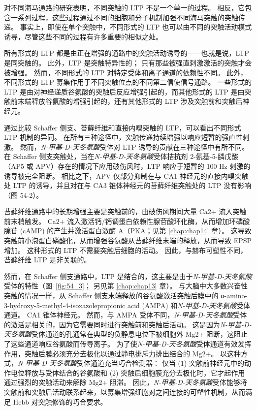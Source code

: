 对不同海马通路的研究表明，不同突触的 LTP 不是一个单一的过程。
相反，它包含一系列过程，这些过程通过不同的细胞和分子机制加强不同海马突触的突触传递。
事实上，即使在单个突触中，不同形式的 LTP 也可以由不同的突触活动模式诱导，尽管这些不同的过程有许多重要的相似之处。


所有形式的 LTP 都是由正在增强的通路中的突触活动诱导的——也就是说，LTP 是同突触的。
此外，LTP 是突触特异性的；
只有那些被强直刺激激活的突触才会被增强。
然而，不同形式的 LTP 对特定受体和离子通道的依赖性不同。 此外，不同形式的 LTP 募集作用于不同突触位点的不同第二信使信号通路。
一些形式的 LTP 是由对神经递质谷氨酸的突触后反应增强引起的，而其他形式的 LTP 是由突触前末端释放谷氨酸的增强引起的，还有其他形式的 LTP 涉及突触前和突触后神经元。


通过比较 Schaffer 侧支、苔藓纤维和直接内嗅突触的 LTP，可以看出不同形式 LTP 机制的异同。
在所有三种途径中，突触传递持续增强以响应短暂的强直性刺激。
然而，\textit{N-甲基-D-天冬氨酸}受体对 LTP 诱导的贡献在三种途径中有所不同。
在 Schaffer 侧支突触处，当在\textit{N-甲基-D-天冬氨酸}受体拮抗剂 2-氨基-5-膦戊酸（AP5 或 APV）存在的情况下应用破伤风时，LTP 响应于短暂的 100 Hz 刺激的诱导被完全阻断。
相比之下，APV 仅部分抑制在与 CA1 神经元的直接内嗅突触处 LTP 的诱导，并且对在与 CA3 锥体神经元的苔藓纤维突触处的 LTP 没有影响（图 54-2）。


苔藓纤维通路中的长期增强主要是突触前的，由破伤风期间大量 Ca2+ 流入突触前末梢触发。
Ca2+ 流入激活钙/钙调蛋白依赖性腺苷酸环化酶，从而增加环磷酸腺苷 (cAMP) 的产生并激活蛋白激酶 A（PKA；见第 \ref{chap:chap14} 章）。
这导致突触前小泡蛋白磷酸化，从而增强谷氨酸从苔藓纤维末端的释放，从而导致 EPSP 增加。
这种形式的 LTP 不需要突触后细胞的活动。
因此，与赫布可塑性不同，苔藓纤维 LTP 是非关联的。


然而，在 Schaffer 侧支通路中，LTP 是结合的，这主要是由于\textit{N-甲基-D-天冬氨酸}受体的特性（图~\ref{fig:54_3}；
另见第 \ref{chap:chap13} 章）。
与大脑中大多数兴奋性突触的情况一样，从 Schaffer 侧支末端释放的谷氨酸激活突触后膜中的 α-amino-3-hydroxy-5-methyl-4-isoxazolepropionic acid (AMPA) 和\textit{N-甲基-D-天冬氨酸}受体通道。
CA1 锥体神经元。 然而，与 AMPA 受体不同，\textit{N-甲基-D-天冬氨酸}受体的激活是相关的，因为它需要同时进行突触前和突触后活动。
这是因为\textit{N-甲基-D-天冬氨酸}受体通道的孔通常在典型的负静息电位下被细胞外 Mg2+ 阻断，这阻止了这些通道响应谷氨酸而传导离子。
为了使\textit{N-甲基-D-天冬氨酸}受体通道有效发挥作用，突触后膜必须充分去极化以通过静电排斥力排出结合的 Mg2+。
以这种方式，\textit{N-甲基-D-天冬氨酸}受体通道充当巧合检测器：
仅当 (1) 突触前神经元中的动作电位释放与受体结合的谷氨酸和 (2) 突触后细胞膜充分去极化时，它才起作用 通过强烈的突触活动来解除 Mg2+ 阻滞。
因此，\textit{N-甲基-D-天冬氨酸}受体能够将突触前和突触后活动联系起来，以募集增强细胞对之间连接的可塑性机制，从而满足 Hebb 对突触修饰的巧合要求。


